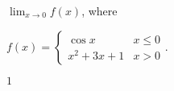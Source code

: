 {$\displaystyle \lim_{x\to 0} f(x)$, where 

$f(x) = \left\{\begin{array}{cl} \cos x & x\leq 0 \\ x^2+3x+1 & x>0 \end{array}\right.$.}
{$1$}




